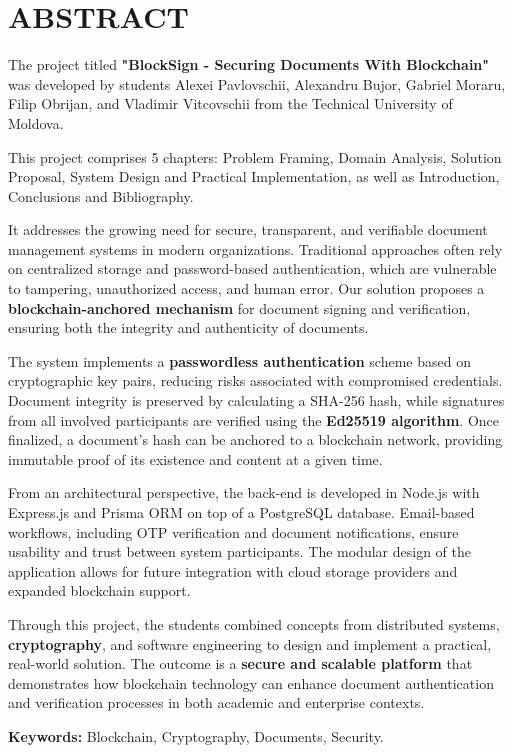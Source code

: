 \chapter*{ABSTRACT}
\thispagestyle{empty}

The project titled \textbf{"BlockSign - Securing Documents With Blockchain"} was developed by students Alexei Pavlovschii, Alexandru Bujor, Gabriel Moraru, Filip Obrijan, and Vladimir Vitcovschii from the Technical University of Moldova.

This project comprises 5 chapters: Problem Framing, Domain Analysis, Solution Proposal, System Design and Practical Implementation, as well as Introduction, Conclusions and Bibliography.

It addresses the growing need for secure, transparent, and verifiable document management systems in modern organizations. Traditional approaches often rely on centralized storage and password-based authentication, which are vulnerable to tampering, unauthorized access, and human error. Our solution proposes a \textbf{blockchain-anchored mechanism} for document signing and verification, ensuring both the integrity and authenticity of documents.

The system implements a \textbf{passwordless authentication} scheme based on cryptographic key pairs, reducing risks associated with compromised credentials. Document integrity is preserved by calculating a SHA-256 hash, while signatures from all involved participants are verified using the \textbf{Ed25519 algorithm}. Once finalized, a document’s hash can be anchored to a blockchain network, providing immutable proof of its existence and content at a given time.

From an architectural perspective, the back-end is developed in Node.js with Express.js and Prisma ORM on top of a PostgreSQL database. Email-based workflows, including OTP verification and document notifications, ensure usability and trust between system participants. The modular design of the application allows for future integration with cloud storage providers and expanded blockchain support.

Through this project, the students combined concepts from distributed systems, \textbf{cryptography}, and software engineering to design and implement a practical, real-world solution. The outcome is a \textbf{secure and scalable platform} that demonstrates how blockchain technology can enhance document authentication and verification processes in both academic and enterprise contexts.

\textbf{Keywords: } Blockchain, Cryptography, Documents, Security.
